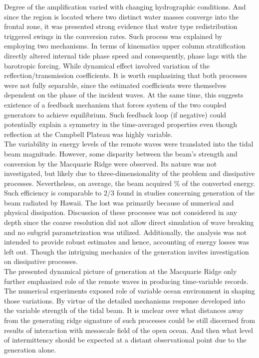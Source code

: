 \documentclass[12pt]{article}
\begin{document}
Degree of the amplification varied with changing hydrographic conditions. And 
since the region is located where two distinct water masses converge into the frontal zone, 
it was presented strong evidence that water type redistribution triggered swings in the conversion 
rates. Such process was explained by employing two mechanisms. In terms of kinematics upper column 
stratification directly altered internal tide phase speed and consequently, phase lags with the 
barotropic forcing. While dynamical effect involved variation of the reflection/transmission 
coefficients. It is worth emphasizing that both processes were not fully separable, since the 
estimated coefficients were themselves dependent on the phase of the incident waves. At the same 
time, this suggests existence of a feedback mechanism that forces system of the two coupled 
generators to achieve equilibrium. Such feedback loop (if negative) could potentially explain a 
symmetry in the time-averaged properties even though reflection at the Campbell Plateau was highly 
variable.\\

The variability in energy levels of the remote waves were translated into the tidal beam magnitude. 
However, some disparity between the beam's strength and conversion by the Macquarie Ridge were 
observed. Its nature was not investigated, but likely due to three-dimensionality of the problem 
and dissipative processes. Nevertheless, on average, the beam acquired \% of the converted energy. 
Such efficiency is comparable to $2/3$ found in studies concerning generation of the beam radiated 
by Hawaii. The lost was primarily because of numerical and physical dissipation. Discussion 
of these processes was not considered in any depth since the coarse resolution did not 
allow direct simulation of wave breaking and no subgrid parametrization was utilized. Additionally, 
the analysis was not intended to provide robust estimates and hence, accounting of energy losses 
was left out. Though the intriguing mechanics of the generation invites investigation on 
dissipative processes.\\

The presented dynamical picture of generation at the Macquarie Ridge only further emphasized role 
of the remote waves in producing time-variable records. The numerical experiments exposed role of 
variable ocean environment in shaping those variations. By virtue of the detailed mechanisms 
response developed into the variable strength of the tidal beam. It is unclear over 
what distances away from the generating ridge signature of such processes could be still discerned 
from results of interaction with mesoscale field of the open ocean. And then what level of 
intermittency should be expected at a distant observational point due to the generation alone.
\end{document}
